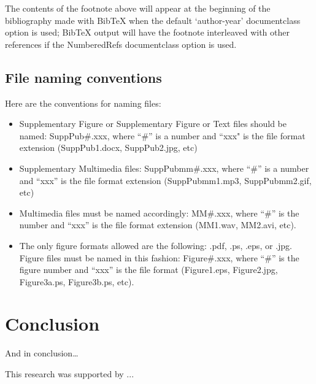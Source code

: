\documentclass[reprint]{JASA}
\begin{document}
The contents of the footnote above will appear at the beginning of the
bibliography made with BibTeX when the default `author-year' documentclass option is used;
BibTeX output will have the footnote interleaved with other
references if the NumberedRefs documentclass option is used.

\subsection{File naming conventions}
Here are the conventions for naming files:

\begin{itemize}
\item
Supplementary Figure or
	Supplementary Figure or Text files should be named: SuppPub\#.xxx, where ``\#'' is
	a number and ``xxx" is the file format extension
	(SuppPub1.docx, SuppPub2.jpg, etc)

\item
	Supplementary Multimedia files: SuppPubmm\#.xxx, where ``\#'' is a
	number and ``xxx'' is the file format extension (SuppPubmm1.mp3,
	SuppPubmm2.gif, etc)

\item
Multimedia files must be named accordingly: MM\#.xxx, where ``\#'' is the
number and ``xxx'' is the file format extension (MM1.wav, MM2.avi, etc).

\item
The only figure formats allowed are the following: 
.pdf, .ps, .eps, or .jpg. Figure files must be named in this fashion:
Figure\#.xxx, where ``\#'' is the figure number and ``xxx'' is the file format
(Figure1.eps, Figure2.jpg, Figure3a.ps, Figure3b.ps, etc). 

\end{itemize}


\section{\label{sec:5}Conclusion}

And in conclusion\ldots

\begin{acknowledgments}
This research was supported by  ...
\end{acknowledgments}




\appendix
\end{document}
